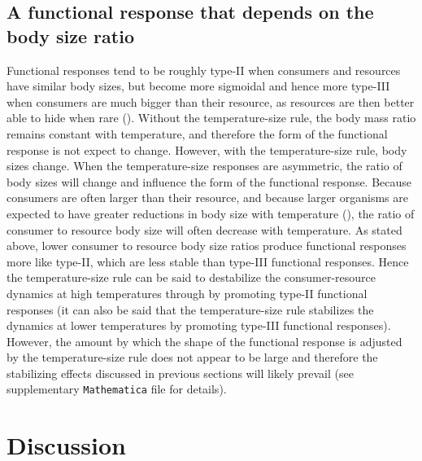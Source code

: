 \documentclass[11pt]{article}
\begin{document}
\subsection*{A functional response that depends on the body size ratio}

Functional responses tend to be roughly type-II when consumers and resources have similar body sizes, but become more sigmoidal and hence more type-III when consumers are much bigger than their resource, as resources are then better able to hide when rare (\cite{Kalinkat2013}).
Without the temperature-size rule, the body mass ratio remains constant with temperature, and therefore the form of the functional response is not expect to change.
However, with the temperature-size rule, body sizes change.
When the temperature-size responses are asymmetric, the ratio of body sizes will change and influence the form of the functional response.
Because consumers are often larger than their resource, and because larger organisms are expected to have greater reductions in body size with temperature (\cite{Forster2012}), the ratio of consumer to resource body size will often decrease with temperature.
As stated above, lower consumer to resource body size ratios produce functional responses more like type-II, which are less stable than type-III functional responses.
Hence the temperature-size rule can be said to destabilize the consumer-resource dynamics at high temperatures through by promoting type-II functional responses (it can also be said that the temperature-size rule stabilizes the dynamics at lower temperatures by promoting type-III functional responses).
However, the amount by which the shape of the functional response is adjusted by the temperature-size rule does not appear to be large and therefore the stabilizing effects discussed in previous sections will likely prevail (see supplementary \texttt{Mathematica} file for details). 

\section*{Discussion}





\end{document}
